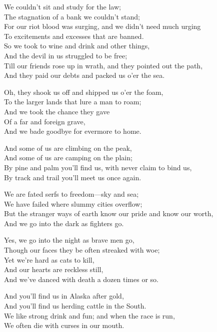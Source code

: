 

\begin{poemblock}
We couldn't sit and study for the law;\\
\idt The stagnation of a bank we couldn't stand;\\
For our riot blood was surging, and we didn't need much urging\\
To excitements and excesses that are banned.\\
So we took to wine and drink and other things,\\
\idt And the devil in us struggled to be free;\\
Till our friends rose up in wrath, and they pointed out the path,\\
And they paid our debts and packed us o'er the sea.

Oh, they shook us off and shipped us o'er the foam,\\
To the larger lands that lure a man to roam;\\
\idt And we took the chance they gave\\
\idt Of a far and foreign grave,\\
And we bade goodbye for evermore to home.

And some of us are climbing on the peak,\\
\idt And some of us are camping on the plain;\\
By pine and palm you'll find us, with never claim to bind us,\\
By track and trail you'll meet us once again.

We are fated serfs to freedom—sky and sea;\\
\idt We have failed where slummy cities overflow;\\
But the stranger ways of earth know our pride and know our worth,\\
And we go into the dark as fighters go.

Yes, we go into the night as brave men go,\\
Though our faces they be often streaked with woe;\\
\idt Yet we're hard as cats to kill,\\
\idt And our hearts are reckless still,\\
And we've danced with death a dozen times or so.

And you'll find us in Alaska after gold,\\
\idt And you'll find us herding cattle in the South.\\
We like strong drink and fun; and when the race is run,\\
\idt We often die with curses in our mouth.


\end{poemblock}
